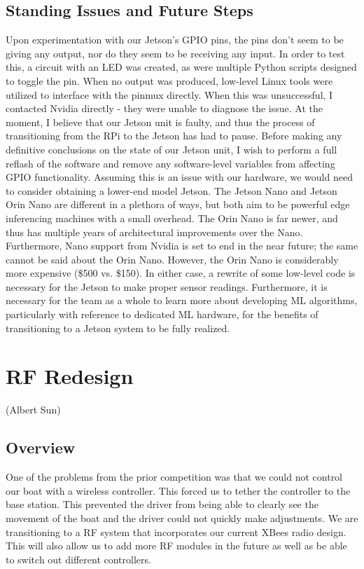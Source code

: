 \documentclass{article}
\begin{document}
\subsection{Standing Issues and Future Steps}
Upon experimentation with our Jetson's GPIO pins, the pins don't seem to be giving any output, nor do they seem to be receiving any input. In order to test this, a circuit with an LED was created, as were multiple Python scripts designed to toggle the pin. When no output was produced, low-level Linux tools were utilized to interface with the pinmux directly. When this was unsuccessful, I contacted Nvidia directly - they were unable to diagnose the issue. At the moment, I believe that our Jetson unit is faulty, and thus the process of transitioning from the RPi to the Jetson has had to pause.
\newline
\indent Before making any definitive conclusions on the state of our Jetson unit, I wish to perform a full reflash of the software and remove any software-level variables from affecting GPIO functionality. Assuming this is an issue with our hardware, we would need to consider obtaining a lower-end model Jetson. 
\newline
\indent The Jetson Nano and Jetson Orin Nano are different in a plethora of ways, but both aim to be powerful edge inferencing machines with a small overhead. The Orin Nano is far newer, and thus has multiple years of architectural improvements over the Nano. Furthermore, Nano support from Nvidia is set to end in the near future; the same cannot be said about the Orin Nano. However, the Orin Nano is considerably more expensive (\$500 vs. \$150).
\newline
\indent In either case, a rewrite of some low-level code is necessary for the Jetson to make proper sensor readings. Furthermore, it is necessary for the team as a whole to learn more about developing ML algorithms, particularly with reference to dedicated ML hardware, for the benefits of transitioning to a Jetson system to be fully realized.

\section{RF Redesign}
(Albert Sun)
\subsection{Overview}

One of the problems from the prior competition was that we could not control our boat with a wireless controller. This forced us to tether the controller to the base station. This prevented the driver from being able to clearly see the movement of the boat and the driver could not quickly make adjustments. We are transitioning to a RF system that incorporates our current XBees radio design. This will also allow us to add more RF modules in the future as well as be able to switch out different controllers.
\end{document}
